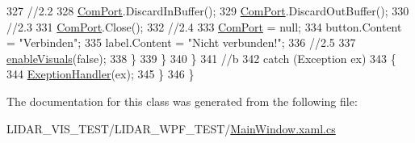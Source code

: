 \begin{DoxyCode}
327                         \textcolor{comment}{//2.2}
328                         \hyperlink{class_l_i_d_a_r___controller_1_1_main_window_ae8b01d789601ddbc234ede8a0b43eb7b}{ComPort}.DiscardInBuffer();
329                         \hyperlink{class_l_i_d_a_r___controller_1_1_main_window_ae8b01d789601ddbc234ede8a0b43eb7b}{ComPort}.DiscardOutBuffer();
330                         \textcolor{comment}{//2.3}
331                         \hyperlink{class_l_i_d_a_r___controller_1_1_main_window_ae8b01d789601ddbc234ede8a0b43eb7b}{ComPort}.Close();
332                         \textcolor{comment}{//2.4}
333                         \hyperlink{class_l_i_d_a_r___controller_1_1_main_window_ae8b01d789601ddbc234ede8a0b43eb7b}{ComPort} = null;
334                         button.Content = \textcolor{stringliteral}{"Verbinden"};
335                         label.Content = \textcolor{stringliteral}{"Nicht verbunden!"};
336                         \textcolor{comment}{//2.5}
337                         \hyperlink{class_l_i_d_a_r___controller_1_1_main_window_abc77995f990c7ef9dd53c0331b2c70a1}{enableVisuals}(\textcolor{keyword}{false});
338                     \}
339                 \}
340             \}
341             \textcolor{comment}{//b}
342             \textcolor{keywordflow}{catch} (Exception ex)
343             \{
344                 \hyperlink{class_l_i_d_a_r___controller_1_1_main_window_a1c0ad2dd56b20d3fdb928b918c0bc153}{ExeptionHandler}(ex);
345             \}
346         \}
\end{DoxyCode}


The documentation for this class was generated from the following file\+:\begin{DoxyCompactItemize}
\item 
L\+I\+D\+A\+R\+\_\+\+V\+I\+S\+\_\+\+T\+E\+S\+T/\+L\+I\+D\+A\+R\+\_\+\+W\+P\+F\+\_\+\+T\+E\+S\+T/\hyperlink{_main_window_8xaml_8cs}{Main\+Window.\+xaml.\+cs}\end{DoxyCompactItemize}
